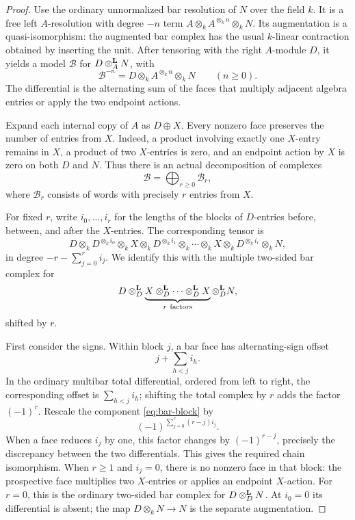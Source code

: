 \begin{proof}
Use the ordinary unnormalized bar resolution of \(N\) over
the field \(k\).  It is a free left \(A\)-resolution with
degree \(-n\) term \(A\otimes_k A^{\otimes_k n}\otimes_k N\).
Its augmentation is a quasi-isomorphism: the augmented
bar complex has the usual \(k\)-linear contraction obtained
by inserting the unit.  After tensoring with the right
\(A\)-module \(D\), it yields a model \(\mathcal B\) for
\(D\otimes^{\mathbf L}_AN\), with
\[
\mathcal B^{-n}=D\otimes_k A^{\otimes_k n}\otimes_k N
\qquad(n\ge0).
\]
The differential is the alternating sum of the faces
that multiply adjacent algebra entries or apply the two
endpoint actions.

Expand each internal copy of \(A\) as \(D\oplus X\).
Every nonzero face preserves the number of entries from
\(X\).  Indeed, a product involving exactly one \(X\)-entry
remains in \(X\), a product of two \(X\)-entries is zero,
and an endpoint action by \(X\) is zero on both \(D\) and
\(N\).  Thus there is an actual decomposition of complexes
\[
\mathcal B=\bigoplus_{r\ge0}\mathcal B_r,
\]
where \(\mathcal B_r\) consists of words with precisely
\(r\) entries from \(X\).

For fixed \(r\), write \(i_0,\ldots,i_r\) for the lengths
of the blocks of \(D\)-entries before, between, and after
the \(X\)-entries.  The corresponding tensor is
\begin{equation}
\label{eq:bar-block}
D\otimes_kD^{\otimes_k i_0}\otimes_k X
\otimes_kD^{\otimes_k i_1}\otimes_k\cdots
\otimes_k X\otimes_kD^{\otimes_k i_r}\otimes_k N,
\end{equation}
in degree \(-r-\sum_{j=0}^r i_j\).
We identify this with the multiple two-sided bar complex
for
\begin{equation}
\label{eq:derived-multibar}
D\otimes^{\mathbf L}_D
\underbrace{X\otimes^{\mathbf L}_D\cdots\otimes^{\mathbf L}_D X}_{r\ \text{factors}}
\otimes^{\mathbf L}_D N,
\end{equation}
shifted by \(r\).

First consider the signs.  Within block \(j\), a bar face
has alternating-sign offset
\[
j+\sum_{h<j}i_h.
\]
In the ordinary multibar total differential, ordered from
left to right, the corresponding offset is
\(\sum_{h<j}i_h\); shifting the total complex by \(r\)
adds the factor \((-1)^r\).
Rescale the component \eqref{eq:bar-block} by
\[
(-1)^{\sum_{j=0}^r(r-j)i_j}.
\]
When a face reduces \(i_j\) by one, this factor changes by
\((-1)^{r-j}\), precisely the discrepancy between the
two differentials.  This gives the required chain
isomorphism.  When \(r\ge1\) and \(i_j=0\), there is no
nonzero face in that block: the prospective face multiplies
two \(X\)-entries or applies an endpoint \(X\)-action.
For \(r=0\), this is the ordinary two-sided bar complex
for \(D\otimes^{\mathbf L}_DN\).  At \(i_0=0\) its differential is absent;
the map \(D\otimes_kN\to N\) is the separate augmentation.


\end{proof}

